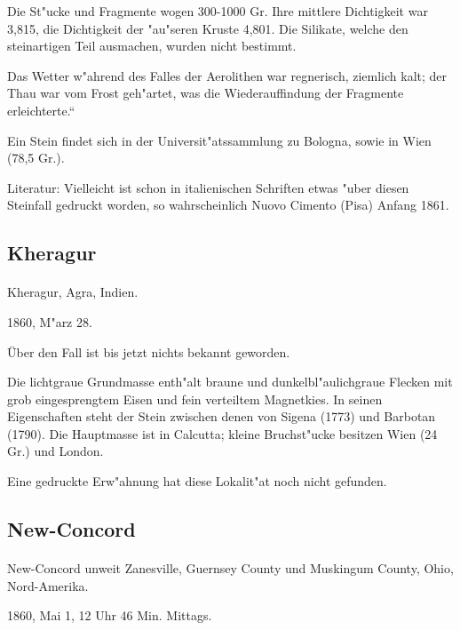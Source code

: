 \documentclass[a4paper, 11pt, oneside]{article}
\begin{document}
Die St"ucke und Fragmente wogen 300-1000 Gr. Ihre mittlere Dichtigkeit war 3,815, die Dichtigkeit der "au"seren Kruste 4,801. Die Silikate, welche den steinartigen Teil ausmachen, wurden nicht bestimmt.

Das Wetter w"ahrend des Falles der Aerolithen war regnerisch, ziemlich kalt; der Thau war vom Frost geh"artet, was die Wiederauffindung der Fragmente erleichterte.“

Ein Stein findet sich in der Universit"atssammlung zu Bologna, sowie in Wien (78,5 Gr.).

Literatur: Vielleicht ist schon in italienischen Schriften etwas "uber diesen Steinfall gedruckt worden, so wahrscheinlich Nuovo Cimento (Pisa) Anfang 1861.

\subsection{Kheragur}
\normalsize
\paragraph{}
Kheragur, Agra, Indien.

1860, M"arz 28.

Über den Fall ist bis jetzt nichts bekannt geworden.

Die lichtgraue Grundmasse enth"alt braune und dunkelbl"aulichgraue Flecken mit grob eingesprengtem Eisen und fein verteiltem Magnetkies. In seinen Eigenschaften steht der Stein zwischen denen von Sigena (1773) und Barbotan (1790). Die Hauptmasse ist in Calcutta; kleine Bruchst"ucke besitzen Wien (24 Gr.) und London.

Eine gedruckte Erw"ahnung hat diese Lokalit"at noch nicht gefunden.

\subsection{New-Concord}
\normalsize
\paragraph{}
New-Concord unweit Zanesville, Guernsey County und Muskingum County, Ohio, Nord-Amerika.

1860, Mai 1, 12 Uhr 46 Min. Mittags.
\end{document}
